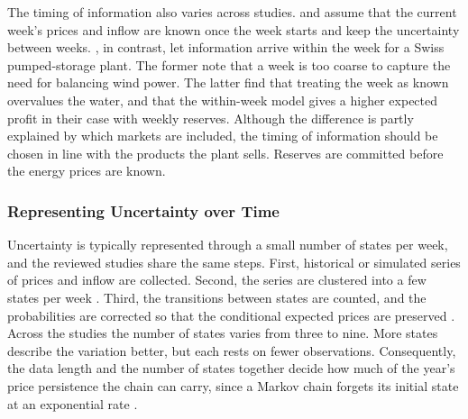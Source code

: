 The timing of information also varies across studies. \citet{helseth2013}
and \citet{bore2026assessing} assume that the current week's prices and
inflow are known once the week starts and keep the uncertainty between
weeks. \citet{abgottspon2014}, in contrast, let information arrive within
the week for a Swiss pumped-storage plant.
The former note that a week is too coarse to capture the need for balancing
wind power. The latter find that treating the week as known overvalues the
water, and that the within-week model gives a higher expected profit in
their case with weekly reserves.
Although the difference is partly explained by which markets are included,
the timing of information should be chosen in line with the products the
plant sells. Reserves are committed before the energy prices are known.

\subsubsection{Representing Uncertainty over Time}
\label{sec:lit_unc_repr}

Uncertainty is typically represented through a small number of states per
week, and the reviewed studies share the same steps. First, historical or
simulated series of prices and inflow are collected. Second, the series are
clustered into a few states per week \citep{alic2023optimal,bore2026assessing}.
Third, the transitions between states are counted, and the probabilities
are corrected so that the conditional expected prices are preserved
\citep{helseth2016,mo2001}.
Across the studies the number of states varies from three to nine. More
states describe the variation better, but each rests on fewer observations.
Consequently, the data length and the number of states together decide how
much of the year's price persistence the chain can carry, since a Markov
chain forgets its initial state at an exponential rate \citep{mo2001}.

